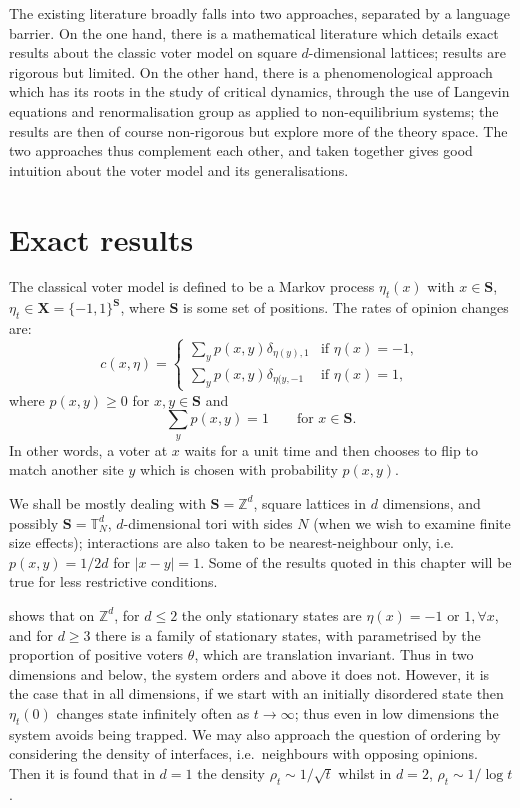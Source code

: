 \documentclass[10pt,english]{report}
\begin{document}
The existing literature broadly falls into two approaches, separated by a language barrier. On the one hand, there is a mathematical literature which details exact results about the classic voter model on square $d$-dimensional lattices; results are rigorous but limited. On the other hand, there is a phenomenological approach which has its roots in the study of critical dynamics, through the use of Langevin equations and renormalisation group as applied to non-equilibrium systems; the results are then of course non-rigorous but explore more of the theory space. The two approaches thus complement each other, and taken together gives good intuition about the voter model and its generalisations.

\section{Exact results}

The classical voter model \citep{voter1,voter2} is defined to be a Markov process $\eta_t(x)$ with $x \in \mathbf S$, $\eta_t \in \mathbf X=\{-1,1\}^\mathbf{S}$, where $\mathbf S$ is some set of positions. The rates of opinion changes are:
\begin{equation*}
c(x, \eta) = \begin{cases}
\sum_y p(x,y) \delta_{\eta(y),1} & \textrm{if $\eta(x) = -1$}, \\
\sum_y p(x,y) \delta_{\eta(y,-1} & \textrm{if $\eta(x) = 1$},
\end{cases}
\end{equation*}
where $p(x,y) \ge 0$ for $x,y \in \mathbf{S}$ and $$\sum_y p(x,y) = 1 \qquad \textrm{for $x \in \mathbf{S}$}.$$ In other words, a voter at $x$ waits for a unit time and then chooses to flip to match another site $y$ which is chosen with probability $p(x,y)$.

We shall be mostly dealing with $\mathbf S = \mathbb{Z}^d$, square lattices in $d$ dimensions, and possibly $\mathbf S = \mathbb{T}_N^d$, $d$-dimensional tori with sides $N$ (when we wish to examine finite size effects); interactions are also taken to be nearest-neighbour only, i.e.\ $p(x,y) = 1/2d$ for $\left| x - y \right| = 1$. Some of the results quoted in this chapter will be true for less restrictive conditions.

\citet{liggettbook} shows that on $\mathbb{Z}^d$, for $d \le 2$ the only stationary states are $\eta(x) = -1\textrm{ or }1, \forall x$, and for $d \ge 3$ there is a family of stationary states, with parametrised by the proportion of positive voters $\theta$, which are translation invariant. Thus in two dimensions and below, the system orders and above it does not.  However, it is the case that in all dimensions, if we start with an initially disordered state then $\eta_t(0)$ changes state infinitely often as $t \rightarrow \infty$; thus even in low dimensions the system avoids being trapped. We may also approach the question of ordering by considering the density of interfaces, i.e.\ neighbours with opposing opinions. Then it is found that in $d=1$ the density $\rho_t \sim 1/\sqrt{t}$ whilst in $d=2$, $\rho_t \sim 1/\log t$. 
\end{document}
